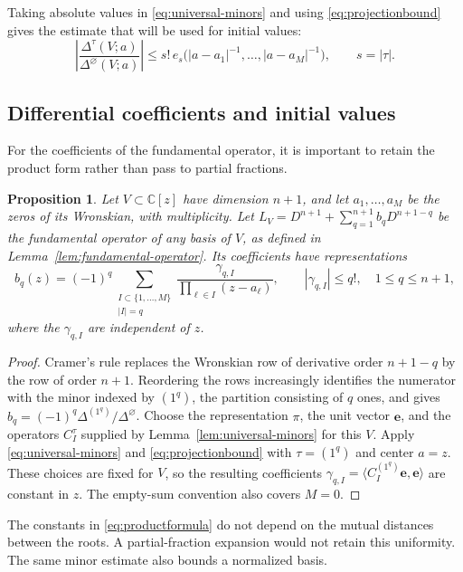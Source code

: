 \documentclass[11pt,letterpaper,reqno]{amsart}
\newtheorem{prop}[thm]{Proposition}
\theoremstyle{remark}
\numberwithin{equation}{section}
\newcommand{\C}{\mathbb C}
\newcommand{\ev}{\bm e}
\begin{document}
Taking absolute values in \eqref{eq:universal-minors} and using
\eqref{eq:projectionbound} gives the estimate that will be used for initial
values:
\begin{equation}\label{eq:minor-es-bound}
 \left|\frac{\Delta^\tau(V;a)}{\Delta^\varnothing(V;a)}\right|
 \le s!\,e_s\bigl(|a-a_1|^{-1},\ldots,|a-a_M|^{-1}\bigr),
 \qquad s=|\tau|.
\end{equation}

\subsection{Differential coefficients and initial values}

For the coefficients of the fundamental operator, it is important to retain
the product form rather than pass to partial fractions.

\begin{prop}\label{prop:polynomialcoeff}
Let $V\subset\C[z]$ have dimension $n+1$, and let $a_1,\ldots,a_M$ be the
zeros of its Wronskian, with multiplicity. Let
$L_V=D^{n+1}+\sum_{q=1}^{n+1}b_qD^{n+1-q}$ be the fundamental operator
of any basis of $V$, as defined in Lemma~\ref{lem:fundamental-operator}.
Its coefficients have representations
\begin{equation}\label{eq:productformula}
 b_q(z)=(-1)^q\sum_{\substack{I\subset\{1,\ldots,M\}\\|I|=q}}
       \frac{\gamma_{q,I}}{\prod_{\ell\in I}(z-a_\ell)},
 \qquad |\gamma_{q,I}|\le q!,\quad 1\le q\le n+1,
\end{equation}
where the $\gamma_{q,I}$ are independent of $z$.
\end{prop}
\begin{proof}
Cramer's rule replaces the Wronskian row of derivative order $n+1-q$ by the
row of order $n+1$. Reordering the rows increasingly identifies the numerator
with the minor indexed by $(1^q)$, the partition consisting of $q$ ones,
and gives
$b_q=(-1)^q\Delta^{(1^q)}/\Delta^\varnothing$.
Choose the representation $\pi$, the unit vector $\ev$, and the operators
$C_I^\tau$ supplied by Lemma~\ref{lem:universal-minors} for this $V$.
Apply \eqref{eq:universal-minors} and \eqref{eq:projectionbound} with
$\tau=(1^q)$ and center $a=z$. These choices are fixed for $V$, so the
resulting coefficients
$\gamma_{q,I}=\langle C_I^{(1^q)}\ev,\ev\rangle$ are constant in $z$.
The empty-sum convention also covers $M=0$.
\end{proof}

The constants in \eqref{eq:productformula} do not depend on the mutual
distances between the roots. A partial-fraction expansion would not retain
this uniformity. The same minor estimate also bounds a normalized basis.
\end{document}
